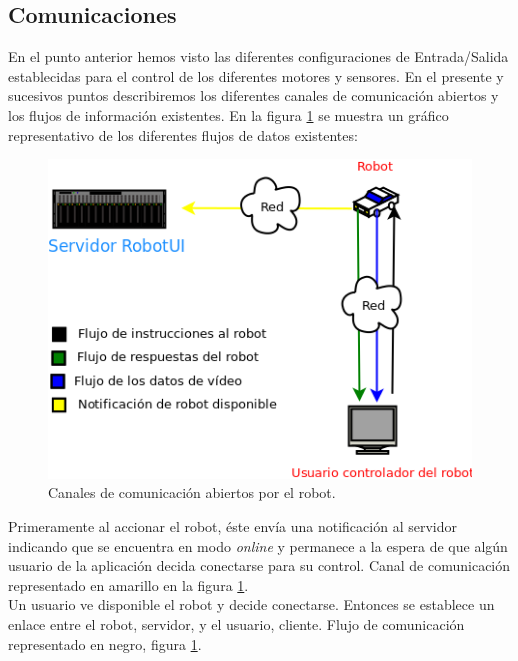 \subsection{Comunicaciones}

En el punto anterior hemos visto las diferentes configuraciones de Entrada/Salida establecidas para el control de los diferentes motores y sensores. En el presente y sucesivos puntos describiremos los diferentes
canales de comunicación abiertos y los flujos de información existentes. En la figura \ref{figura:comunicaciones-robot} se muestra un gráfico representativo de los diferentes flujos de datos existentes:


\begin{figure}[H]
  \begin{center}
    \includegraphics[scale=0.6]{diagramas/flujo-comunicaciones-robot.png}
  \end{center}
  \caption{Canales de comunicación abiertos por el robot.}
  \label{figura:comunicaciones-robot}
\end{figure}


Primeramente al accionar el robot, éste envía una notificación al servidor indicando que se encuentra en modo \emph{online} y permanece a la espera de que algún usuario de la aplicación decida conectarse para su control.
Canal de comunicación representado en amarillo en la figura \ref{figura:comunicaciones-robot}.\\

Un usuario ve disponible el robot y decide conectarse. Entonces se establece un enlace entre el robot, servidor, y el usuario, cliente. Flujo de comunicación representado en negro, figura \ref{figura:comunicaciones-robot}.\\

